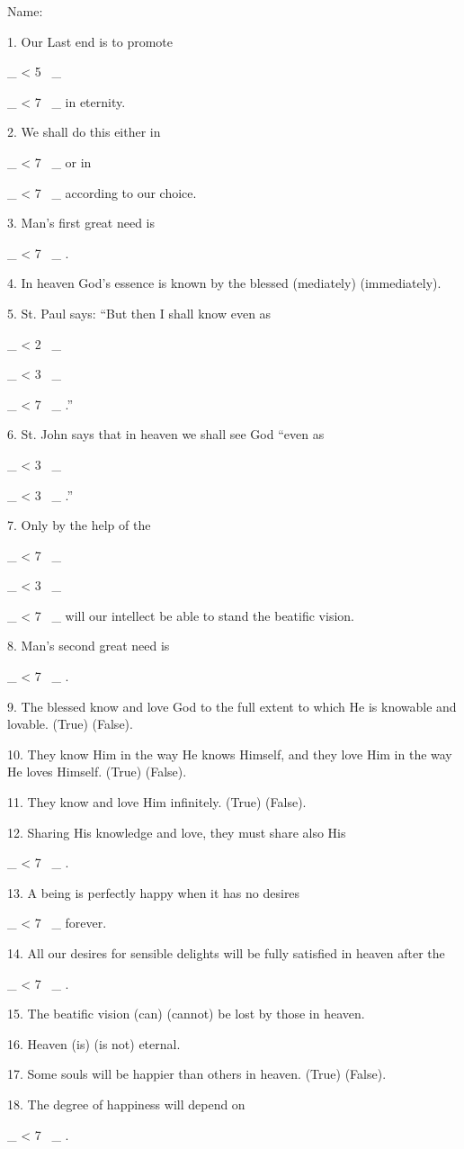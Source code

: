 \documentclass[a4paper,14pt]{memoir}
\title{}
\newcommand\textjarman[1]{{\jarman #1}}
\newcounter{z}
\newcommand\spaces[1]{\rule{0pt}{18pt} \_\loop \ifnum\value{z} < #1
~\_%
\stepcounter{z}%
\repeat%
\setcounter{z}{0}}
\begin{document}
\setlength{\parskip}{6pt plus2pt minus2pt}


\noindent Name:




1. Our Last end is to promote \spaces{5} \spaces{7} in  eternity.  

2.  We  shall  do  this
either in \spaces{7} or in \spaces{7} according to our choice. 

3. Man's first  great
need is \spaces{7}.  

4.  In  heaven  God's  essence  is  known  by  the  blessed
(\textjarman{mediately}) (\textjarman{immediately}). 

5. St. Paul says: “But then I shall know even  as
\spaces{2} \spaces{3} \spaces{7}.” 

6. St. John says that in heaven we shall see God “even as \spaces{3} \spaces{3}.”


7. Only by the help of the \spaces{7} \spaces{3} \spaces{7} will our intellect be able  to  stand  the
beatific vision. 

8. Man's second great need is \spaces{7}. 

9. The  blessed  know
and love God to the full extent to which He is knowable and lovable.  (\textjarman{True})
(\textjarman{False}). 

10. They know Him in the way He knows Himself, and  they  love  Him
in the way He loves Himself. (\textjarman{True}) (\textjarman{False}). 

11.  They  know  and  love  Him
infinitely. (\textjarman{True}) (\textjarman{False}). 

12. Sharing His knowledge and  love,  they  must
share also His \spaces{7}. 

13. A  being  is  perfectly  happy  when  it  has  no
desires \spaces{7} forever. 

14. All our desires for sensible  delights  will  be
fully satisfied in heaven  after the \spaces{7}.  

15.  The  beatific  vision  (\textjarman{can})
(\textjarman{cannot}) be lost by those in heaven. 

16. Heaven (\textjarman{is}) (\textjarman{is not})  eternal.  

17.
Some souls will be happier than others in heaven. (\textjarman{True})  (\textjarman{False}).  

18.  The
degree of happiness will depend on \spaces{7}. 
\end{document}
